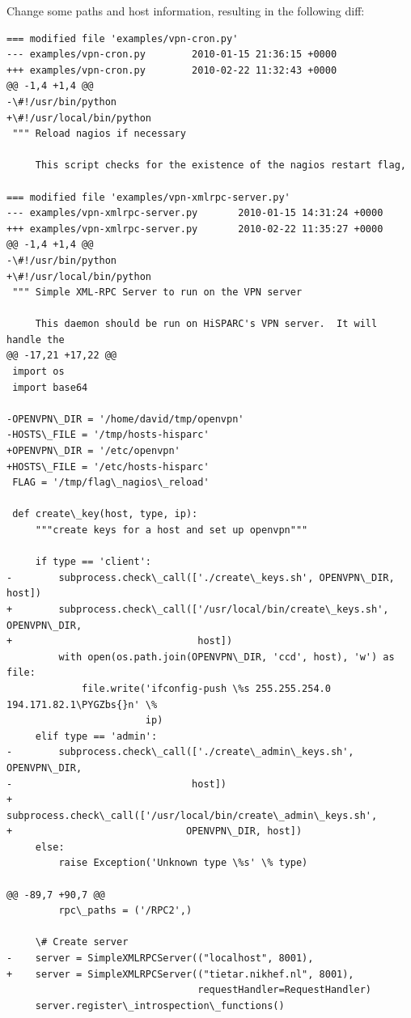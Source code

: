 \documentclass[a4paper,11pt,english]{sphinxmanual}
\def\PYGZbs{\char`\\}
\begin{document}
Change some paths and host information, resulting in the following diff:

\begin{Verbatim}[commandchars=\\\{\}]
=== modified file 'examples/vpn-cron.py'
--- examples/vpn-cron.py        2010-01-15 21:36:15 +0000
+++ examples/vpn-cron.py        2010-02-22 11:32:43 +0000
@@ -1,4 +1,4 @@
-\#!/usr/bin/python
+\#!/usr/local/bin/python
 """ Reload nagios if necessary

     This script checks for the existence of the nagios restart flag,

=== modified file 'examples/vpn-xmlrpc-server.py'
--- examples/vpn-xmlrpc-server.py       2010-01-15 14:31:24 +0000
+++ examples/vpn-xmlrpc-server.py       2010-02-22 11:35:27 +0000
@@ -1,4 +1,4 @@
-\#!/usr/bin/python
+\#!/usr/local/bin/python
 """ Simple XML-RPC Server to run on the VPN server

     This daemon should be run on HiSPARC's VPN server.  It will handle the
@@ -17,21 +17,22 @@
 import os
 import base64

-OPENVPN\_DIR = '/home/david/tmp/openvpn'
-HOSTS\_FILE = '/tmp/hosts-hisparc'
+OPENVPN\_DIR = '/etc/openvpn'
+HOSTS\_FILE = '/etc/hosts-hisparc'
 FLAG = '/tmp/flag\_nagios\_reload'

 def create\_key(host, type, ip):
     """create keys for a host and set up openvpn"""

     if type == 'client':
-        subprocess.check\_call(['./create\_keys.sh', OPENVPN\_DIR, host])
+        subprocess.check\_call(['/usr/local/bin/create\_keys.sh', OPENVPN\_DIR,
+                                host])
         with open(os.path.join(OPENVPN\_DIR, 'ccd', host), 'w') as file:
             file.write('ifconfig-push \%s 255.255.254.0 194.171.82.1\PYGZbs{}n' \%
                        ip)
     elif type == 'admin':
-        subprocess.check\_call(['./create\_admin\_keys.sh', OPENVPN\_DIR,
-                               host])
+        subprocess.check\_call(['/usr/local/bin/create\_admin\_keys.sh',
+                              OPENVPN\_DIR, host])
     else:
         raise Exception('Unknown type \%s' \% type)

@@ -89,7 +90,7 @@
         rpc\_paths = ('/RPC2',)

     \# Create server
-    server = SimpleXMLRPCServer(("localhost", 8001),
+    server = SimpleXMLRPCServer(("tietar.nikhef.nl", 8001),
                                 requestHandler=RequestHandler)
     server.register\_introspection\_functions()
\end{Verbatim}
\end{document}
